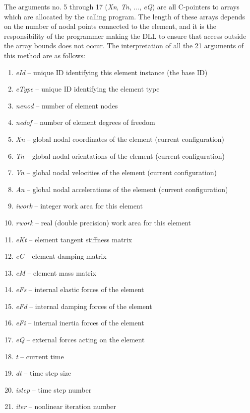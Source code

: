 The arguments no. 5 through 17 ({\sl Xn}, {\sl Tn}, ..., {\sl eQ})
are all C-pointers to arrays which are allocated by the calling program.
The length of these arrays depends on the number of nodal points connected
to the element, and it is the responsibility of the programmer making the DLL
to ensure that access outside the array bounds does not occur.
The interpretation of all the 21 arguments of this method are as follows:

\begin{enumerate}
\item{\sl eId} --
  unique ID identifying this element instance (the base ID)
\item{\sl eType} --
  unique ID identifying the element type
\item{\sl nenod} --
  number of element nodes
\item{\sl nedof} --
  number of element degrees of freedom
\item{\sl Xn} --
  global nodal coordinates of the element (current configuration)
\item{\sl Tn} --
  global nodal orientations of the element (current configuration)
\item{\sl Vn} --
  global nodal velocities of the element (current configuration)
\item{\sl An} --
  global nodal accelerations of the element (current configuration)
\item{\sl iwork} --
  integer work area for this element
\item{\sl rwork} --
  real (double precision) work area for this element
\item{\sl eKt} --
  element tangent stiffness matrix
\item{\sl eC} --
  element damping matrix
\item{\sl eM} --
  element mass matrix
\item{\sl eFs} --
  internal elastic forces of the element
\item{\sl eFd} --
  internal damping forces of the element
\item{\sl eFi} --
  internal inertia forces of the element
\item{\sl eQ} --
  external forces acting on the element
\item{\sl t} --
  current time
\item{\sl dt} --
  time step size
\item{\sl istep} --
  time step number
\item{\sl iter} --
  nonlinear iteration number
\end{enumerate}

